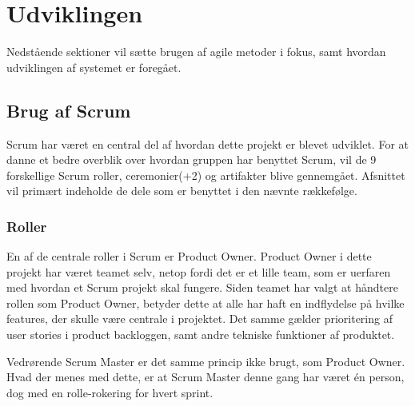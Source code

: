 \chapter{Udviklingen}\label{ch:Udviklingen}
Nedstående sektioner vil sætte brugen af agile metoder i fokus, samt hvordan udviklingen af systemet er foregået.

\section{Brug af Scrum}

Scrum har været en central del af hvordan dette projekt er blevet udviklet.
For at danne et bedre overblik over hvordan gruppen har benyttet Scrum, vil de 9 forskellige Scrum roller, ceremonier(+2) og artifakter blive gennemgået. Afsnittet vil primært indeholde de dele som er benyttet i den nævnte rækkefølge.

\subsection{Roller}

En af de centrale roller i Scrum er Product Owner. 
Product Owner i dette projekt har været teamet selv, netop fordi det er et lille team, som er uerfaren med hvordan et Scrum projekt skal fungere. Siden teamet har valgt at håndtere rollen som Product Owner, betyder dette at alle har haft en indflydelse på hvilke features, der skulle være centrale i projektet. Det samme gælder prioritering af user stories i product backloggen, samt andre tekniske funktioner af produktet. 

Vedrørende Scrum Master er det samme princip ikke brugt, som Product Owner. Hvad der menes med dette, er at Scrum Master denne gang har været én person, dog med en rolle-rokering for hvert sprint. 

